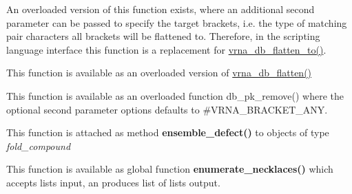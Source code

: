 \begin{DoxyRefList}
An overloaded version of this function exists, where an additional second parameter can be passed to specify the target brackets, i.\+e. the type of matching pair characters all brackets will be flattened to. Therefore, in the scripting language interface this function is a replacement for \mbox{\hyperlink{group__struct__utils__dot__bracket_ga690425199c8b71545e7196e3af1436f8}{vrna\+\_\+db\+\_\+flatten\+\_\+to()}}.  
\item[Global \mbox{\hyperlink{group__struct__utils__dot__bracket_ga690425199c8b71545e7196e3af1436f8}{vrna\+\_\+db\+\_\+flatten\+\_\+to}} (char $\ast$string, const char target\mbox{[}3\mbox{]}, unsigned int options)]\label{wrappers__wrappers000128}%
%
 This function is available as an overloaded version of \mbox{\hyperlink{group__struct__utils__dot__bracket_gafd1304f5a86e2e3f1425e725cde44fa2}{vrna\+\_\+db\+\_\+flatten()}}  
\item[Global \mbox{\hyperlink{group__struct__utils__dot__bracket_ga97dbebaa3fc49524cf5afa338a6c52ee}{vrna\+\_\+db\+\_\+pk\+\_\+remove}} (const char $\ast$structure, unsigned int options)]\label{wrappers__wrappers000129}%
%
 This function is available as an overloaded function {\ttfamily db\+\_\+pk\+\_\+remove()} where the optional second parameter {\ttfamily options} defaults to \#\+V\+R\+N\+A\+\_\+\+B\+R\+A\+C\+K\+E\+T\+\_\+\+A\+NY.  
\item[Global \mbox{\hyperlink{group__part__func__global_gaaf197722d1faa86af5e7b4240acafdee}{vrna\+\_\+ensemble\+\_\+defect}} (vrna\+\_\+fold\+\_\+compound\+\_\+t $\ast$fc, const char $\ast$structure)]\label{wrappers__wrappers000112}%
%
 This function is attached as method {\bfseries{ensemble\+\_\+defect()}} to objects of type {\itshape fold\+\_\+compound}  
\item[Global \mbox{\hyperlink{group__combinatorics__utils_gae081ac655a76bd5c4b3d86c60b096b75}{vrna\+\_\+enumerate\+\_\+necklaces}} (const unsigned int $\ast$type\+\_\+counts)]\label{wrappers__wrappers000015}%
%
 This function is available as global function {\bfseries{enumerate\+\_\+necklaces()}} which accepts lists input, an produces list of lists output.  
\item[Global \mbox{\hyperlink{group__eval_gac96577cf232c71160f762737a994b7c6}{vrna\+\_\+eval\+\_\+circ\+\_\+consensus\+\_\+structure}} (const char $\ast$$\ast$alignment, const char $\ast$structure)]\label{wrappers__wrappers000058}%
%
$$
\end{DoxyRefList}
